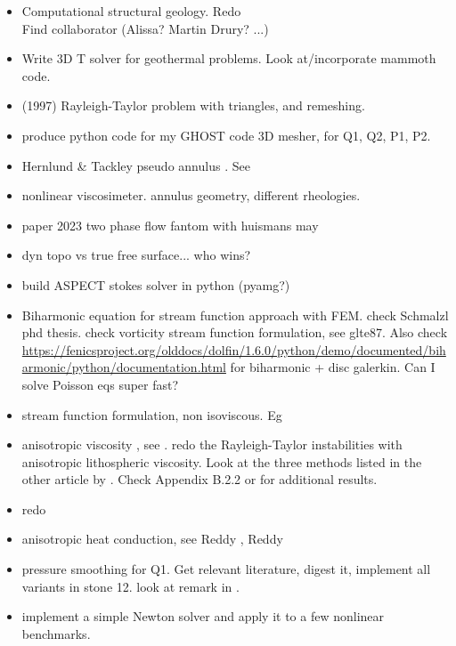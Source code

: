 \documentclass[a4paper]{article}
\begin{document}
\begin{itemize}
\item Computational structural geology. Redo  \\
Find collaborator (Alissa? Martin Drury? ...)
\item Write 3D T solver for geothermal problems. Look at/incorporate
mammoth code.
\item \textcite{vaks97} (1997) Rayleigh-Taylor problem with triangles, and remeshing.
\item produce python code for my GHOST code \textcite{thie18} 3D mesher, for Q1, Q2, P1, P2.
\item Hernlund \& Tackley pseudo annulus . See \textcite{josv21}
\item nonlinear viscosimeter. annulus geometry, different rheologies.
\item paper 2023 two phase flow fantom with huismans may
\item dyn topo vs true free surface... who wins?
\item build ASPECT stokes solver in python (pyamg?)
\item Biharmonic equation for stream function approach with FEM. check Schmalzl phd thesis.
check vorticity stream function formulation, see glte87.
Also check \url{https://fenicsproject.org/olddocs/dolfin/1.6.0/python/demo/documented/biharmonic/python/documentation.html} for biharmonic + disc galerkin. Can I solve Poisson eqs super fast?
\item stream function formulation, non isoviscous. Eg \cite{sagy13}
\item anisotropic viscosity , see \textcite{leha08}.
redo the Rayleigh-Taylor instabilities with 
anisotropic lithospheric viscosity.
Look at the three methods listed in the other article by \textcite{leha08b}. 
Check Appendix B.2.2 or \textcite{perr19} for additional results.

\item redo 
\item anisotropic heat conduction, see  Reddy \cite[p121]{reddybook2}, Reddy \cite[p143]{reddybook2} 
\item pressure smoothing for Q1. Get relevant literature, digest it, implement all variants in stone 12.
look at remark in \textcite{lumh24}.

\item implement a simple Newton solver and apply it to a few nonlinear  benchmarks. 


\end{itemize}
\end{document}
